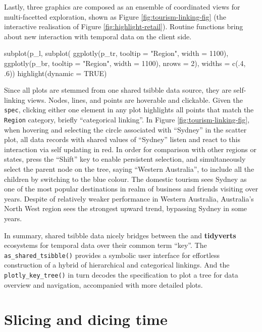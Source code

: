 Lastly, three graphics are composed as an ensemble of coordinated views
for multi-facetted exploration, shown as Figure
\ref{fig:tourism-linking-fig} (the interactive realisation of Figure
\ref{fig:highlight-retail}). Routine functions bring about new
interaction with temporal data on the client side.

\begin{Schunk}
\begin{Sinput}
subplot(p_l,
  subplot(
    ggplotly(p_tr, tooltip = "Region", width = 1100),
    ggplotly(p_br, tooltip = "Region", width = 1100),
    nrows = 2),
  widths = c(.4, .6)) %
  highlight(dynamic = TRUE)
\end{Sinput}
\end{Schunk}

Since all plots are stemmed from one shared tsibble data source, they
are self-linking views. Nodes, lines, and points are hoverable and
clickable. Given the \texttt{spec}, clicking either one element in any
plot highlights all points that match the \texttt{Region} category,
briefly ``categorical linking''. In Figure
\ref{fig:tourism-linking-fig}, when hovering and selecting the circle
associated with ``Sydney'' in the scatter plot, all data records with
shared values of ``Sydney'' listen and react to this interaction via
self updating in red. In order for comparison with other regions or
states, press the ``Shift'' key to enable persistent selection, and
simultaneously select the parent node on the tree, saying ``Western
Australia'', to include all the children by switching to the blue
colour. The domestic tourism sees Sydney as one of the most popular
destinations in realm of business and friends visiting over years.
Despite of relatively weaker performance in Western Australia,
Australia's North West region sees the strongest upward trend, bypassing
Sydney in some years.

In summary, shared tsibble data nicely bridges between the
 and \textbf{tidyverts} ecosystems for temporal data
over their common term ``key''. The \texttt{as\_shared\_tsibble()}
provides a symbolic user interface for effortless construction of a
hybrid of hierarchical and categorical linkings. And the
\texttt{plotly\_key\_tree()} in turn decodes the specification to plot a
tree for data overview and navigation, accompanied with more detailed
plots.

\hypertarget{slicing-and-dicing-time}{%
\section{Slicing and dicing time}\label{slicing-and-dicing-time}}

